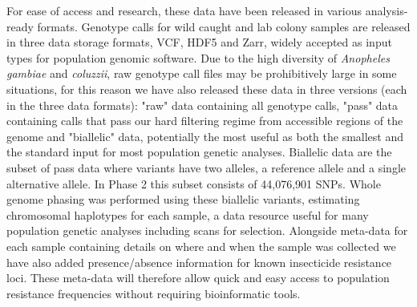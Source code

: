 \documentclass[a4paper,11pt,abstracton,hidelinks]{scrartcl}
\begin{document}
For ease of access and research, these data have been released in various analysis-ready formats.
%
Genotype calls for wild caught and lab colony samples are released in three data storage formats, VCF, HDF5 and Zarr, widely accepted as input types for population genomic software.
%
Due to the high diversity of \textit{Anopheles gambiae} and \textit{coluzzii}, raw genotype call files may be prohibitively large in some situations, for this reason we have also released these data in three versions (each in the three data formats): 
%
"raw" data containing all genotype calls, "pass" data containing calls that pass our hard filtering regime from accessible regions of the genome and "biallelic" data, potentially the most useful as both the smallest and the standard input for most population genetic analyses.
%
Biallelic data are the subset of pass data where variants have two alleles, a reference allele and a single alternative allele.
%
In Phase 2 this subset consists of 44,076,901 SNPs.
%
Whole genome phasing was performed using these biallelic variants, estimating chromosomal haplotypes for each sample, a data resource useful for many population genetic analyses including scans for selection.
%
Alongside meta-data for each sample containing details on where and when the sample was collected we have also added presence/absence information for known insecticide resistance loci.
%
These meta-data will therefore allow quick and easy access to population resistance frequencies without requiring bioinformatic tools. 
\end{document}
